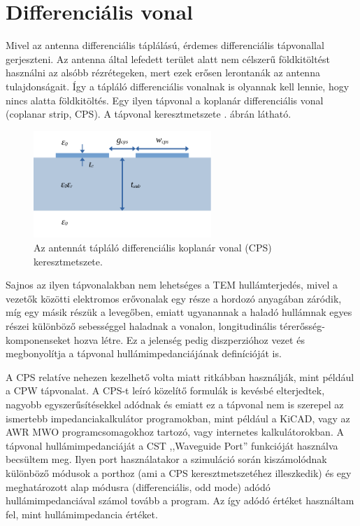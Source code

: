 \section{Differenciális vonal}
Mivel az antenna differenciális táplálású, érdemes differenciális tápvonallal gerjeszteni. Az antenna által lefedett terület alatt nem célszerű földkitöltést használni az alsóbb rézrétegeken, mert ezek erősen lerontanák az antenna tulajdonságait. Így a tápláló differenciális vonalnak is olyannak kell lennie, hogy nincs alatta földkitöltés. Egy ilyen tápvonal a koplanár differenciális vonal (coplanar strip, CPS). A tápvonal keresztmetszete . ábrán látható.
\begin{figure}[h]
	\centering
	\includegraphics[width=0.6\textwidth]{kep/cps.pdf}
	\caption{Az antennát tápláló differenciális koplanár vonal (CPS) keresztmetszete.}
	\label{fig:cps}
\end{figure}
\par Sajnos az ilyen tápvonalakban nem lehetséges a TEM hullámterjedés, mivel a vezetők közötti elektromos erővonalak egy része a hordozó anyagában záródik, míg egy másik részük a levegőben, emiatt ugyanannak a haladó hullámnak egyes részei különböző sebességgel haladnak a vonalon, longitudinális térerősség-komponenseket hozva létre. Ez a jelenség pedig diszperzióhoz vezet és megbonyolítja a tápvonal hullámimpedanciájának definícióját is.
\par A CPS relatíve nehezen kezelhető volta miatt ritkábban használják, mint például a CPW tápvonalat. A CPS-t leíró közelítő formulák is kevésbé elterjedtek, nagyobb egyszerűsítésekkel adódnak és emiatt ez a tápvonal nem is szerepel az ismertebb impedanciakalkulátor programokban, mint például a KiCAD, vagy az AWR MWO programcsomagokhoz tartozó, vagy internetes kalkulátorokban. A tápvonal hullámimpedanciáját a CST ,,Waveguide Port'' funkcióját használva becsültem meg. Ilyen port használatakor a szimuláció során kiszámolódnak különböző módusok a porthoz (ami a CPS keresztmetszetéhez illeszkedik) és egy meghatározott alap módusra (differenciális, odd mode) adódó hullámimpedanciával számol tovább a program. Az így adódó értéket használtam fel, mint hullámimpedancia értéket.
